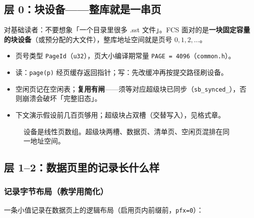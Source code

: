 \subsection{层 0：块设备——整库就是一串页}
\label{sec:cd-dev}

对基础读者：不要想象「一个目录里很多 .sst 文件」。FCS 面对的是\textbf{一块固定容量的块设备}（或预分配的大文件），整库地址空间就是页号 $0,1,2,\ldots$。

\begin{itemize}[leftmargin=1.4em]
  \item 页号类型 \texttt{PageId}（\texttt{u32}），页大小编译期常量 \texttt{PAGE = 4096}（\texttt{common.h}）。
  \item 读：\texttt{page(p)} 经页缓存返回指针；写：先改缓冲再按提交路径刷设备。
  \item 空闲页记在空闲表；\textbf{复用有闸}——须等对应超级块已同步（\texttt{sb\_synced\_}），否则崩溃会破坏「完整旧态」。
  \item 下文演示假设前几百页够用；超级块占双槽（交替写入），见格式章。
\end{itemize}

\begin{figure}[H]
\centering
{}
\caption{设备是线性页数组。超级块两槽、数据页、清单页、空闲页混排在同一地址空间。}
\end{figure}

\subsection{层 1--2：数据页里的记录长什么样}
\label{sec:cd-rec}

\subsubsection{记录字节布局（教学用简化）}
一条小值记录在数据页上的逻辑布局（启用页内前缀前，\texttt{pfx=0}）：


